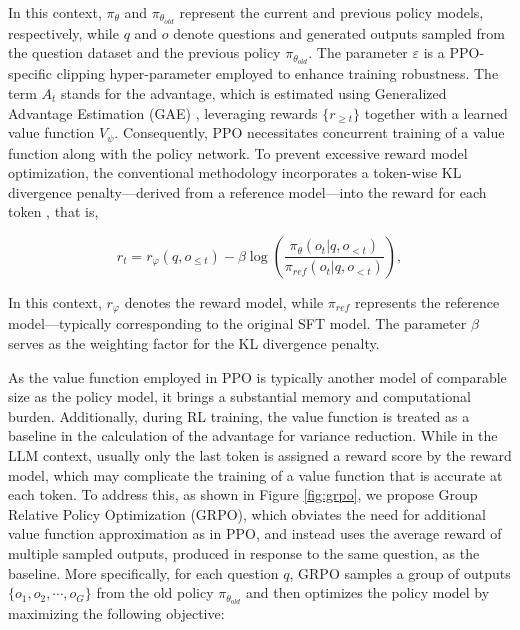 \begin{itemize}[topsep=0pt]
In this context, $\pi_{\theta}$ and $\pi_{\theta_{old}}$ represent the current and previous policy models, respectively, while $q$ and $o$ denote questions and generated outputs sampled from the question dataset and the previous policy $\pi_{\theta_{old}}$. The parameter $\varepsilon$ is a PPO-specific clipping hyper-parameter employed to enhance training robustness. The term $A_t$ stands for the advantage, which is estimated using Generalized Advantage Estimation (GAE) \citep{gae}, leveraging rewards $\{r_{\ge t}\}$ together with a learned value function $V_{\psi}$. Consequently, PPO necessitates concurrent training of a value function along with the policy network. To prevent excessive reward model optimization, the conventional methodology incorporates a token-wise KL divergence penalty—derived from a reference model—into the reward for each token \citep{ouyang2022training}, that is,

\begin{equation}
    r_{t} = r_\varphi(q, o_{\le t}) - \beta \log\left(\frac{\pi_{\theta}(o_{t}|q, o_{<t})}{\pi_{ref}(o_{t}|q, o_{<t})}\right),
\label{eq:PPO-reward}
\end{equation}

In this context, $r_\varphi$ denotes the reward model, while $\pi_{ref}$ represents the reference model—typically corresponding to the original SFT model. The parameter $\beta$ serves as the weighting factor for the KL divergence penalty.

As the value function employed in PPO is typically another model of comparable size as the policy model, it brings a substantial memory and computational burden. Additionally, during RL training, the value function is treated as a baseline in the calculation of the advantage for variance reduction. While in the LLM context, usually only the last token is assigned a reward score by the reward model, which may complicate the training of a value function that is accurate at each token. To address this, as shown in Figure \ref{fig:grpo}, we propose Group Relative Policy Optimization (GRPO), which obviates the need for additional value function approximation as in PPO, and instead uses the average reward of multiple sampled outputs, produced in response to the same question, as the baseline. More specifically, for each question $q$, GRPO samples a group of outputs $\{o_1, o_2, \cdots, o_G\}$  from the old policy  $\pi_{\theta_{old}}$  and then optimizes the policy model by maximizing the following objective:


\end{itemize}
